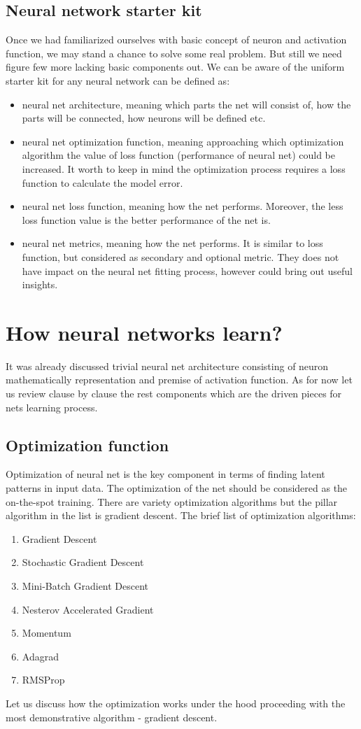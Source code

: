 \subsection{Neural network starter kit}
Once we had familiarized ourselves with basic concept of neuron and activation function, we may stand a chance to solve some real problem. But still we need figure few more lacking basic components out.
We can be aware of the uniform starter kit for any neural network can be defined as:
\begin{itemize}
    \item neural net architecture, meaning which parts the net will consist of, how the parts will be connected, how neurons will be defined etc.
    \item neural net optimization function, meaning approaching which optimization algorithm the value of loss function (performance of neural net) could be increased. It worth to keep in mind the optimization process requires a loss function to calculate the model error.
    \item neural net loss function, meaning how the net performs. Moreover, the less loss function value is the better performance of the net is.
    \item neural net metrics, meaning how the net performs. It is similar to loss function, but considered as secondary and optional metric. They does not have impact on the neural net fitting process, however could bring out useful insights.    
\end{itemize}


\section{How neural networks learn?}
It was already discussed trivial neural net architecture consisting of neuron mathematically representation and premise of activation function. As for now let us review clause by clause the rest components which are the driven pieces for nets learning process.

\subsection{Optimization function}
Optimization of neural net is the key component in terms of finding latent patterns in input data. The optimization of the net should be considered as the on-the-spot training. There are variety optimization algorithms but the pillar algorithm in the list is gradient descent.
The brief list of optimization algorithms:
\begin{enumerate}
    \item Gradient Descent
    \item Stochastic Gradient Descent
    \item Mini-Batch Gradient Descent
    \item Nesterov Accelerated Gradient
    \item Momentum
    \item Adagrad
    \item RMSProp
\end{enumerate}
Let us discuss how the optimization works under the hood proceeding with the most demonstrative algorithm - gradient descent.

